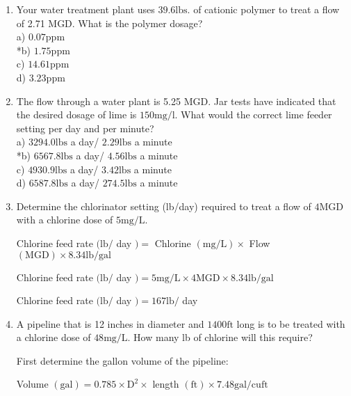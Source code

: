 \documentclass{article}
\begin{document}
\begin{enumerate}



    \item Your water treatment plant uses $39.6 \mathrm{lbs}$. of cationic polymer to treat a flow of 2.71 MGD. What is the polymer dosage?\\
a) $0.07 \mathrm{ppm}$\\
*b) $1.75 \mathrm{ppm}$\\
c) $14.61 \mathrm{ppm}$\\
d) $3.23 \mathrm{ppm}$\\

  \item The flow through a water plant is 5.25 MGD. Jar tests have indicated that the desired dosage of lime is $150 \mathrm{mg} / \mathrm{l}$. What would the correct lime feeder setting per day and per minute?\\

a) $3294.0 \mathrm{lbs}$ a day/ $2.29 \mathrm{lbs}$ a minute\\
*b) $6567.8 \mathrm{lbs}$ a day/ $4.56 \mathrm{lbs}$ a minute\\
c) $4930.9 \mathrm{lbs}$ a day/ $3.42 \mathrm{lbs}$ a minute\\
d) $6587.8 \mathrm{lbs}$ a day/ $274.5 \mathrm{lbs}$ a minute\\


\item Determine the chlorinator setting (lb/day) required to treat a flow of $4 \mathrm{MGD}$ with a chlorine dose of $5 \mathrm{mg} / \mathrm{L}$.

Chlorine feed rate $(\mathrm{lb} /$ day $)=$ Chlorine $(\mathrm{mg} / \mathrm{L}) \times$ Flow $(\mathrm{MGD}) \times 8.34 \mathrm{lb} / \mathrm{gal}$

Chlorine feed rate $(\mathrm{lb} /$ day $)=5 \mathrm{mg} / \mathrm{L} \times 4 \mathrm{MGD} \times 8.34 \mathrm{lb} / \mathrm{gal}$

Chlorine feed rate $(\mathrm{lb} /$ day $)=167 \mathrm{lb} /$ day

\item A pipeline that is 12 inches in diameter and $1400 \mathrm{ft}$ long is to be treated with a chlorine dose of $48 \mathrm{mg} / \mathrm{L}$. How many lb of chlorine will this require?

First determine the gallon volume of the pipeline:

Volume $(\mathrm{gal})=0.785 \times \mathrm{D}^{2} \times$ length $(\mathrm{ft}) \times 7.48 \mathrm{gal} / \mathrm{cu} \mathrm{ft}$


\end{enumerate}
\end{document}

